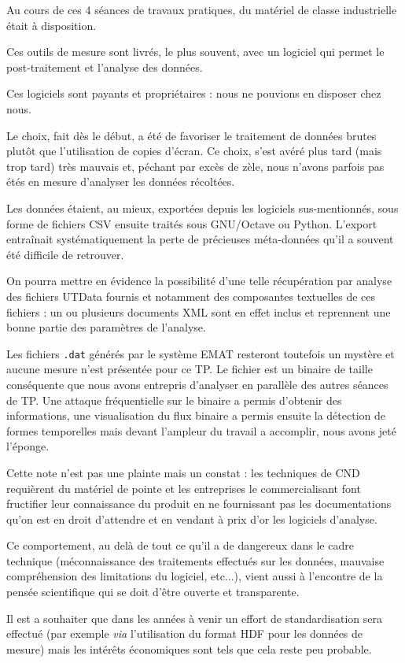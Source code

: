 Au cours de ces 4 séances de travaux pratiques, du matériel de classe industrielle était à disposition.

Ces outils de mesure sont livrés, le plus souvent, avec un logiciel qui permet le post-traitement et l'analyse des données.

Ces logiciels sont payants et propriétaires : nous ne pouvions en disposer chez nous.

Le choix, fait dès le début, a été de favoriser le traitement de données brutes plutôt que l'utilisation de copies d'écran. Ce choix, s'est avéré plus tard (mais trop tard) très mauvais et, péchant par excès de zèle, nous n'avons parfois pas étés en mesure d'analyser les données récoltées.

Les données étaient, au mieux, exportées depuis les logiciels sus-mentionnés, sous forme de fichiers CSV ensuite traités sous GNU/Octave ou Python. L'export entraînait systématiquement la perte de précieuses méta-données qu'il a souvent été difficile de retrouver.

On pourra mettre en évidence la possibilité d'une telle récupération par analyse des fichiers UTData fournis et notamment des composantes textuelles de ces fichiers : un ou plusieurs documents XML sont en effet inclus et reprennent une bonne partie des paramètres de l'analyse.

Les fichiers \texttt{.dat} générés par le système EMAT resteront toutefois un mystère et aucune mesure n'est présentée pour ce TP. Le fichier est un binaire de taille conséquente que nous avons entrepris d'analyser en parallèle des autres séances de TP. Une attaque fréquentielle sur le binaire a permis d'obtenir des informations, une visualisation du flux binaire a permis ensuite la détection de formes temporelles mais devant l'ampleur du travail a accomplir, nous avons jeté l'éponge.

Cette note n'est pas une plainte mais un constat : les techniques de CND requièrent du matériel de pointe et les entreprises le commercialisant font fructifier leur connaissance du produit en ne fournissant pas les documentations qu'on est en droit d'attendre et en vendant à prix d'or les logiciels d'analyse.

Ce comportement, au delà de tout ce qu'il a de dangereux dans le cadre technique (méconnaissance des traitements effectués sur les données, mauvaise compréhension des limitations du logiciel, etc...), vient aussi à l'encontre de la pensée scientifique qui se doit d'être ouverte et transparente.

Il est a souhaiter que dans les années à venir un effort de standardisation sera effectué (par exemple \textit{via} l'utilisation du format HDF pour les données de mesure) mais les intérêts économiques sont tels que cela reste peu probable.